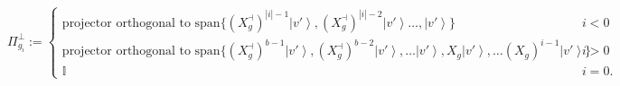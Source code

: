 \documentclass{article}
\begin{document}
\begin{proposition}
\begin{footnotesize}
\begin{displaymath}
      \Pi_{g_{i}}^{\perp}:=\begin{cases}
        \text{projector orthogonal to }\text{span}\{(X_{g}^{\dashv})^{|i|-1}\left|v'\right\rangle ,(X_{g}^{\dashv})^{|i|-2}\left|v'\right\rangle \dots,\left|v'\right\rangle \}                                                                  & i<0  \\
        \text{projector orthogonal to }\text{span}\{(X_{g}^{\dashv})^{b-1}\left|v'\right\rangle ,(X_{g}^{\dashv})^{b-2}\left|v'\right\rangle ,\dots\left|v'\right\rangle ,X_{g}\left|v'\right\rangle ,\dots(X_{g})^{i-1}\left|v'\right\rangle \} & i>0  \\
        \mathbb{I}                                                                                                                                                                                                                               & i=0.
      \end{cases}
    \end{displaymath}
  \end{footnotesize}
\end{proposition}
\end{document}

